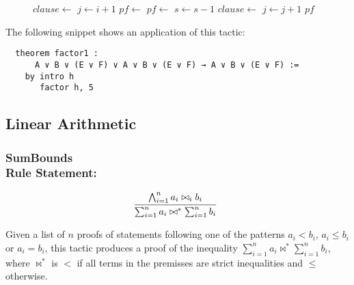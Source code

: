 \begin{figure}[t]
\begin{algorithmic}[1]
  \State $clause \gets $ 
    \State $j \gets i + 1$
        \State $pf \gets $ 
        \State $pf \gets $ 
        \State $s \gets s - 1$
        \State $clause \gets $ 
      \Else
        \State $j \gets j + 1$
      \EndIf
    \EndWhile
  \EndFor
  \State \Return $pf$
\EndFunction
\end{algorithmic}\label{factorCore}
\end{figure}

The following snippet shows an application of this tactic:

\begin{verbatim}
  theorem factor1 :
      A ∨ B ∨ (E ∨ F) ∨ A ∨ B ∨ (E ∨ F) → A ∨ B ∨ (E ∨ F) :=
    by intro h
       factor h, 5
\end{verbatim}

\subsection{Linear Arithmetic}

\subsubsection*{SumBounds\\Rule Statement:}
\[
  \infer[]{\sum_{i = 1}^{n} a_{i} \bowtie^{*} \sum_{i = 1}^{n} b_{i}}{\bigwedge_{i = 1}^{n} a_{i} \bowtie_{i} b_{i}}
\]

Given a list of $n$ proofs of statements following one of the patterns $a_{i} < b_{i}$, $a_{i} \le b_{i}$ or $a_{i} = b_{i}$, this
tactic produces a proof of the inequality $\sum_{i = 1}^{n} a_{i} \bowtie^{*} \sum_{i = 1}^{n} b_{i}$, where $\bowtie^{*}$ is $<$ if
all terms in the premisses are strict inequalities and $\le$ otherwise.

